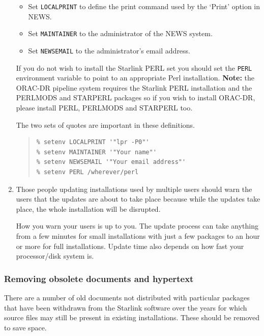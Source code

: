 \documentclass[twoside,11pt]{article}
\renewcommand{\_}{\texttt{\symbol{95}}}
\begin{document}
\begin{enumerate}
\begin{itemize}
\item Set \texttt{LOCALPRINT} to define the print command used by the 
`Print' option in NEWS.
\item Set \texttt{MAINTAINER} to the administrator of the NEWS system.
\item Set \texttt{NEWSEMAIL} to the administrator's email address.
\end{itemize}

If you do not wish to install the Starlink PERL set you should set the
\texttt{PERL} environment variable to point to an appropriate Perl
installation.   \textbf{Note:} the ORAC-DR pipeline system requires the
Starlink PERL installation and the PERLMODS and STARPERL packages so if
you wish to install ORAC-DR, please install PERL, PERLMODS and STARPERL too. 

The two sets of quotes are important in these definitions.

\begin{quote}
\begin{verbatim}
% setenv LOCALPRINT '"lpr -P0"'
% setenv MAINTAINER '"Your name"'
% setenv NEWSEMAIL '"Your email address"'
% setenv PERL /wherever/perl
\end{verbatim}
\end{quote}

\item Those people updating installations used by multiple users should warn
the users that the updates are about to take place because while the updates
take place, the whole installation will be disrupted.

How you warn your users is up to you.  The update process can take
anything from a few minutes for small installations with just a few
packages to an hour or more for full installations.  Update time also
depends on how fast your processor/disk system is.

\end{enumerate}

\subsubsection{Removing obsolete documents and hypertext}

There are a number of old documents not distributed with particular
packages that have been withdrawn from the Starlink software over the
years for which source files may still be present in existing installations.  
These should be removed to save space.
\end{document}
